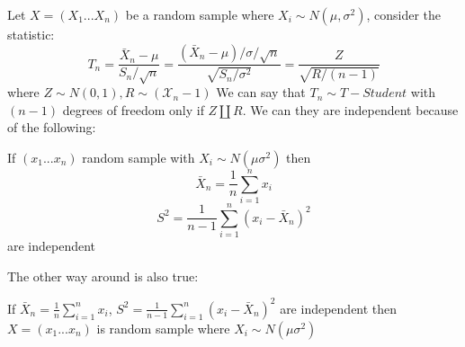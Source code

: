 Let $X=(X_1...X_n)$ be a random sample where $X_i\sim N(\mu,\sigma^2)$, consider the statistic:
$$T_n=\frac{\bar X_n-\mu}{ S_n/\sqrt{n}}=\frac{(\bar X_n-\mu)/\sigma/\sqrt{n}}{\sqrt{S_n/\sigma^2}}=\frac{Z}{\sqrt{R/(n-1)}}$$
where $Z\sim N(0,1), R\sim(\mathcal{X}_n-1)$
We can say that $T_n\sim T-Student$ with $(n-1)$ degrees of freedom only if $Z \coprod R$. We can they are independent because of the following:
\begin{teo}
	If $(x_1...x_n)$ random sample with $X_i\sim N(\mu \sigma^2)$ then 
	$$\bar X_n =\frac{1}{n} \sum_{i=1}^{n} x_i$$	
	$$S^2=\frac{1}{n-1} \sum_{i=1}^{n} (x_i -\bar X_n)^2$$
	are independent
\end{teo}
The other way around is also true:
\begin{teo}
	If $\bar X_n =\frac{1}{n} \sum_{i=1}^{n} x_i$, $S^2=\frac{1}{n-1}\sum_{i=1}^{n} (x_i -\bar X_n)^2$ are independent then $X=(x_1...x_n)$ is random sample where $X_i\sim N(\mu \sigma^2)$ 
\end{teo}

